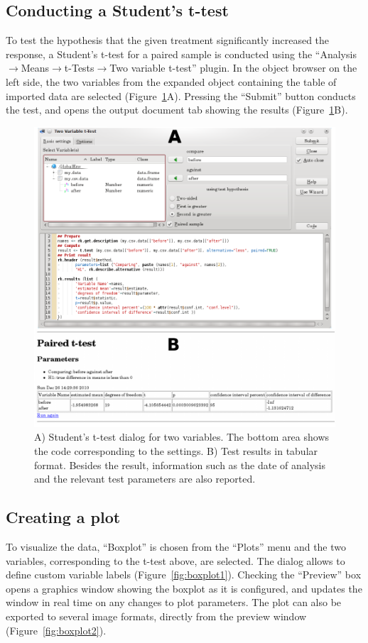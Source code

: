 \subsection{Conducting a Student's t-test}
\label{sec:conducting_ttest}
To test the hypothesis that the given treatment significantly increased the response, a Student's
t-test for a paired sample is conducted using the 
``Analysis$\rightarrow$Means$\rightarrow$t-Tests$\rightarrow$Two variable t-test'' plugin. 
In the object browser on the left side, the two variables from the expanded
 object containing the table of imported data 
are selected (Figure~\ref{fig:t_test}A). 
Pressing the ``Submit'' button conducts the test, and opens the output document tab
showing the results (Figure~\ref{fig:t_test}B).


\begin{figure}[b!]
 \centering
 \includegraphics[width=15.5cm]{../figures/t-test2.png}
 \caption{A) Student's t-test dialog for two variables. The bottom area shows the  code corresponding to the settings. 
  B) Test results in tabular  format. 
Besides the result, information such as the date of analysis and the relevant test parameters are also reported.}
 \label{fig:t_test}
\end{figure}

\subsection{Creating a plot}
\label{sec:create_plot}
To visualize the data, ``Boxplot'' is chosen from the ``Plots'' menu
and the two variables, corresponding to the t-test above, are selected.
The dialog allows to define custom variable labels (Figure~\ref{fig:boxplot1}).
Checking the ``Preview'' box opens a graphics window showing the boxplot as
it is configured, and updates the window in real time on any changes to plot parameters.
The plot can also be exported to several image formats, directly from the preview window (Figure~\ref{fig:boxplot2}).

